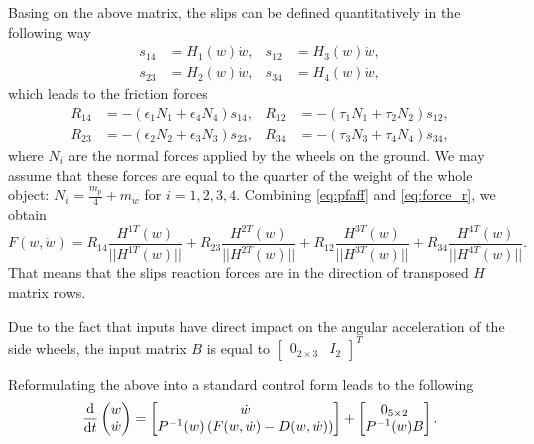 Basing on the above matrix, the slips can be defined quantitatively in the following way
\begin{equation}
\begin{aligned}
s_{14} &= H_1(w)\dot w, & s_{12} &= H_3(w)\dot w,\\
s_{23} &= H_2(w)\dot w, & s_{34} &= H_4(w)\dot w,
\end{aligned}
\end{equation}
which leads to the friction forces
\begin{equation}
\begin{aligned}
\label{eq:force_r}
R_{14}&=-(\epsilon_1 N_1 + \epsilon_4 N_4)s_{14}, & R_{12}&=-(\tau_1 N_1 + \tau_2 N_2)s_{12},\\
R_{23}&=-(\epsilon_2 N_2 + \epsilon_3 N_3)s_{23}, & R_{34}&=-(\tau_3 N_3 + \tau_4 N_4)s_{34},
\end{aligned}
\end{equation}
where $N_i$ are the normal forces applied by the wheels on the ground. We may assume that these
forces are equal to the quarter of the weight of the whole object: $N_i=\frac{m_p}{4}+m_w$ for $i=1, 2, 3, 4$.
Combining \eqref{eq:pfaff} and \eqref{eq:force_r}, we obtain
\begin{equation}
F(w, \dot{w}) = R_{14}\frac{H^{1T}(w)}{||H^{1T}(w)||} + R_{23}\frac{H^{2T}(w)}{||H^{2T}(w)||} + R_{12}\frac{H^{3T}(w)}{||H^{3T}(w)||} + R_{34}\frac{H^{4T}(w)}{||H^{4T}(w)||}.
\end{equation}
That means that the slips reaction forces are in the direction of transposed $H$ matrix rows.

Due to the fact that inputs have direct impact on the angular acceleration of the side wheels, the input matrix $B$ is equal to $\begin{bmatrix}
0_{2 \times 3} & I_2
\end{bmatrix}^T$ 

Reformulating the above into a standard control form leads to the following
\begin{equation}
\frac{\mathrm{d}}{\mathrm{d} t}\begin{pmatrix}
w \\ \dot w
\end{pmatrix}
 = 
 \begin{bmatrix}
 \dot w \\ P^{-1}(w)\left( F(w, \dot w) - D(w, \dot w) \right)
 \end{bmatrix}+\begin{bmatrix}
 0_{5\times 2} \\ P^{-1}(w)B
 \end{bmatrix}.
\end{equation}
